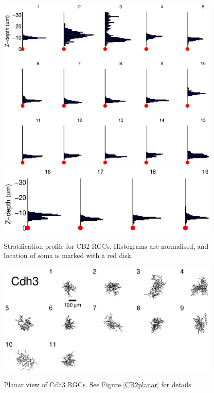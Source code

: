 \documentclass{article}
\begin{document}
\begin{figure}
  \centering
  {\includegraphics[scale=1]{Figures/SupFig2/CB2-stratification-depth-1}}
  {\includegraphics[scale=1]{Figures/SupFig2/CB2-stratification-depth-16}}
  \caption{Stratification profile for CB2 RGCs. Histograms are
    normalised, and location of soma is marked with a red disk. \label{CB2depth}}
\end{figure}




\clearpage


\begin{figure}
  \centering
  {\includegraphics[scale=1.5]{Figures/SupFig1/Cdh3-all-cells-1.eps}}
  \caption{Planar view of Cdh3 RGCs. See Figure \ref{CB2planar} for details.}
\end{figure}
\end{document}
